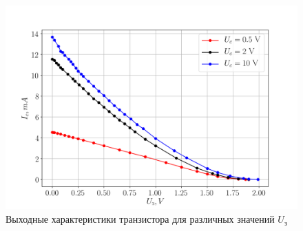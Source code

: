 \begin{figure}[h!]
	\centering
	\includegraphics[width=0.8\linewidth]{fig/task1.png}
	\caption{Выходные характеристики транзистора для различных значений $U_{\text{з}}$}
	\label{fig:7}
\end{figure}


